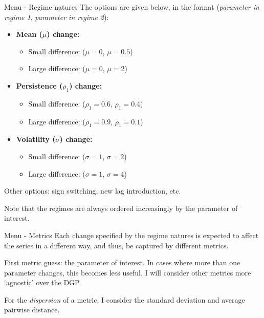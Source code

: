 \documentclass[
  ignorenonframetext,
]{beamer}
\providecommand{\tightlist}{%
  \setlength{\itemsep}{0pt}\setlength{\parskip}{0pt}}\usepackage{longtable,booktabs,array}
\begin{document}
\begin{frame}{Menu - Regime natures}
\label{menu---regime-natures}
The options are given below, in the format (\emph{parameter in regime
1}, \emph{parameter in regime 2}):

\begin{itemize}
\tightlist
\item
  \textbf{Mean (\(\mu\)) change:}

  \begin{itemize}
  \tightlist
  \item
    Small difference: (\(\mu = 0\), \(\mu = 0.5\))
  \item
    Large difference: (\(\mu = 0\), \(\mu = 2\))
  \end{itemize}
\item
  \textbf{Persistence (\(\rho_1\)) change:}

  \begin{itemize}
  \tightlist
  \item
    Small difference: (\(\rho_1 = 0.6\), \(\rho_1 = 0.4\))
  \item
    Large difference: (\(\rho_1 = 0.9\), \(\rho_1 = 0.1\))
  \end{itemize}
\item
  \textbf{Volatility (\(\sigma\)) change:}

  \begin{itemize}
  \tightlist
  \item
    Small difference: (\(\sigma = 1\), \(\sigma = 2\))
  \item
    Large difference: (\(\sigma = 1\), \(\sigma = 4\))
  \end{itemize}
\end{itemize}

Other options: sign switching, new lag introduction, etc.

Note that the regimes are always ordered increasingly by the parameter
of interest.
\end{frame}

\begin{frame}{Menu - Metrics}
\label{menu---metrics}
Each change specified by the regime natures is expected to affect the
series in a different way, and thus, be captured by different metrics.

First metric guess: the parameter of interest. In cases where more than
one parameter changes, this becomes less useful. I will consider other
metrics more `agnostic' over the DGP.

For the \emph{dispersion} of a metric, I consider the standard deviation
and average pairwise distance.
\end{frame}
\end{document}
